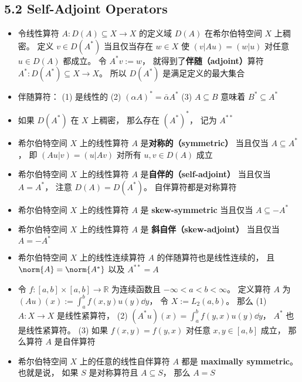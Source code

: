 \subsection{5.2 Self-Adjoint Operators}
\begin{itemize}
\item 令线性算符 $A: D(A) \subseteq X \to X$ 的定义域 $D(A)$ 在希尔伯特空间 $X$ 上稠密。 定义 $v \in D(A^*)$ 当且仅当存在 $w\in X$ 使 $(v|Au) = (w|u)$ 对任意 $u\in D(A)$ 都成立。 令 $A^*v := w$， 就得到了\textbf{伴随（adjoint）}算符 $A^*: D(A^*) \subseteq X \to X$。 所以 $D(A^*)$ 是满足定义的最大集合

\item 伴随算符： (1) 是线性的 (2) $(\alpha A)^* = \bar \alpha A^*$ (3) $A \subseteq B$ 意味着 $B^* \subseteq A^*$

\item 如果 $D(A^*)$ 在 $X$ 上稠密， 那么存在 $(A^*)^*$， 记为 $A^{**}$

\item 希尔伯特空间 $X$ 上的线性算符 $A$ 是\textbf{对称的（symmetric）} 当且仅当 $A \subseteq A^*$， 即 $(Au|v)=(u|Av)$ 对所有 $u, v\in D(A)$ 成立

\item 希尔伯特空间 $X$ 上的线性算符 $A$ 是\textbf{自伴的（self-adjoint）} 当且仅当 $A = A^*$， 注意 $D(A) = D(A^*)$。 自伴算符都是对称算符

\item 希尔伯特空间 $X$ 上的线性算符 $A$ 是 \textbf{skew-symmetric} 当且仅当 $A \subseteq -A^*$

\item 希尔伯特空间 $X$ 上的线性算符 $A$ 是 \textbf{斜自伴（skew-adjoint）} 当且仅当 $A = -A^*$

\item 希尔伯特空间 $X$ 上的线性连续算符 $A$ 的伴随算符也是线性连续的， 且 $\norm{A} = \norm{A^*}$ 以及 $A^{**} = A$

\item 令 $f:[a, b]\times[a,b]\to\mathbb R$ 为连续函数且 $-\infty< a < b < \infty$。 定义算符 $A$ 为 $(Au)(x) := \int_a^b f(x, y)u(y)\dd{y}$， 令 $X := L_2(a, b)$。 那么 (1) $A: X\to X$ 是线性紧算符， (2) $(A^*u)(x) = \int_a^b f(y, x) u(y)\dd{y}$， $A^*$ 也是线性紧算符。 (3) 如果 $f(x, y) = f(y, x)$ 对任意 $x, y\in[a, b]$ 成立， 那么算符 $A$ 是自伴算符

\item 希尔伯特空间 $X$ 上的任意的线性自伴算符 $A$ 都是 \textbf{maximally symmetric}。 也就是说， 如果 $S$ 是对称算符且 $A \subseteq S$， 那么 $A = S$


\end{itemize}
